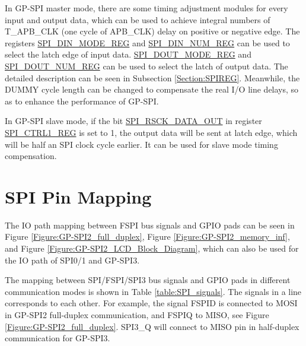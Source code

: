 \documentclass[main\_\_EN.tex]{subfiles}
\begin{document}
In GP-SPI master mode, there are some timing adjustment modules for every input and output data, which can be used to achieve integral numbers of T\_APB\_CLK (one cycle of APB\_CLK) delay on positive or negative edge. The registers \hyperref[regdesc:SPIDINMODEREG]{SPI\_DIN\_MODE\_REG} and \hyperref[regdesc:SPIDINNUMREG]{SPI\_DIN\_NUM\_REG} can be used to select the latch edge of input data. \hyperref[regdesc:SPIDOUTMODEREG]{SPI\_DOUT\_MODE\_REG} and \hyperref[regdesc:SPIDOUTNUMREG]{SPI\_DOUT\_NUM\_REG} can be used to select the latch of output data. The detailed description can be seen in Subsection \ref{Section:SPIREG}. Meanwhile, the DUMMY cycle length can be changed to compensate the real I/O line delays, so as to enhance the performance of GP-SPI.

In GP-SPI slave mode, if the bit \hyperref[fielddesc:SPIRSCKDATAOUT]{SPI\_RSCK\_DATA\_OUT} in register \hyperref[regdesc:SPICTRL1REG]{SPI\_CTRL1\_REG} is set to 1, the output data will be sent at latch edge, which will be half an SPI clock cycle earlier. It can be used for slave mode timing compensation.

\section{SPI Pin Mapping} \label{Section:SPI_Pin_Mapping}

The IO path mapping between FSPI bus signals and GPIO pads can be seen in Figure \ref{Figure:GP-SPI2_full_duplex}, Figure \ref{Figure:GP-SPI2_memory_inf}, and Figure \ref{Figure:GP-SPI2_LCD_Block_Diagram}, which can also be used for the IO path of SPI0/1 and GP-SPI3.

The mapping between SPI/FSPI/SPI3 bus signals and GPIO pads in different communication modes is shown in Table \ref{table:SPI_signals}. The signals in a line corresponds to each other. For example, the signal FSPID is connected to MOSI in GP-SPI2 full-duplex communication, and FSPIQ to MISO, see Figure \ref{Figure:GP-SPI2_full_duplex}. SPI3\_Q will connect to MISO pin in half-duplex communication for GP-SPI3.
\end{document}
